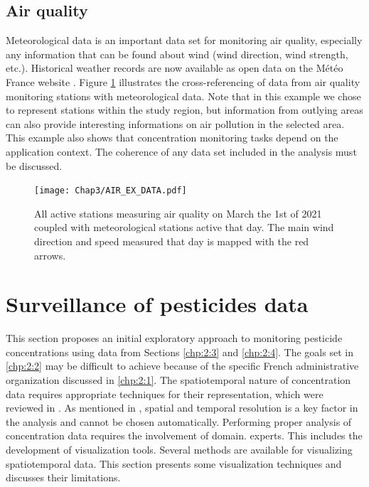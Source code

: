 \subsection{Air quality}

Meteorological data is an important data set for monitoring air quality, especially any information that can be found about wind (wind direction, wind strength, etc.). Historical weather records are now available as open data on the Météo France website \cite{SYNOP}. Figure \ref{fig:air_ex} illustrates the cross-referencing of data from air quality monitoring stations with meteorological data. Note that in this example we chose to represent stations within the study region, but information from outlying areas can also provide interesting informations on air pollution in the selected area. This example also shows that concentration monitoring tasks depend on the application context. The coherence of any data set included in the analysis must be discussed.   

\begin{figure}[ht]
    \centering
    \texttt{[image: Chap3/AIR\_EX\_DATA.pdf]}
    \caption{All active stations measuring air quality on March the 1st of 2021 coupled with meteorological stations active that day. The main wind direction and speed measured that day is mapped with the red arrows.}
    \label{fig:air_ex}
\end{figure}

\section{Surveillance of pesticides data}\label{chp:2:5}

This section proposes an initial exploratory approach to monitoring pesticide concentrations using data from Sections \ref{chp:2:3} and \ref{chp:2:4}. The goals set in \ref{chp:2:2} may be difficult to achieve because of the specific French administrative organization discussed in \ref{chp:2:1}. The spatiotemporal nature of concentration data requires appropriate techniques for their representation, which were reviewed in \cite{Andrienko2003,cressie2015,Maimon2010}. As mentioned in \cite{Ansari2019}, spatial and temporal resolution is a key factor in the analysis and cannot be chosen automatically. Performing proper analysis of concentration data requires the involvement of domain. experts. This includes the development of visualization tools. Several methods are available for visualizing spatiotemporal data. This section presents some visualization techniques and discusses their limitations.

